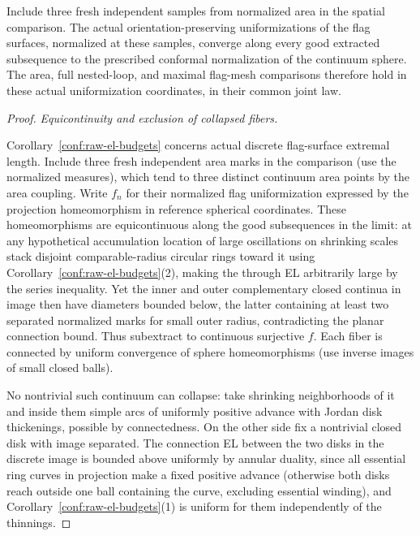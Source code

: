 \begin{proposition}\label{conf:flag-uniformization}
Include three fresh independent samples from normalized area in the spatial comparison. The actual
orientation-preserving uniformizations of the flag surfaces, normalized at these samples, converge
along every good extracted subsequence to the prescribed conformal normalization of the continuum
sphere. The area, full nested-loop, and maximal flag-mesh comparisons therefore hold in these actual
uniformization coordinates, in their common joint law.
\end{proposition}
\begin{proof}
\smallskip\noindent\emph{Equicontinuity and exclusion of collapsed fibers.}\par

Corollary~\ref{conf:raw-el-budgets} concerns actual discrete flag-surface extremal length. Include
three fresh independent area marks in the comparison (use the normalized measures), which tend to
three distinct continuum area points by the area coupling. Write \(f_n\) for their normalized flag
uniformization expressed by the projection homeomorphism in reference spherical coordinates. These
homeomorphisms are equicontinuous along the good subsequences in the limit: at any hypothetical
accumulation location of large oscillations on shrinking scales stack disjoint comparable-radius
circular rings toward it using Corollary~\ref{conf:raw-el-budgets}(2), making the through EL
arbitrarily large by the series inequality. Yet the inner and outer complementary closed continua in
image then have diameters bounded below, the latter containing at least two separated normalized
marks for small outer radius, contradicting the planar connection bound. Thus subextract to
continuous surjective \(f\). Each fiber is connected by uniform convergence of sphere homeomorphisms
(use inverse images of small closed balls).

No nontrivial such continuum can collapse: take shrinking neighborhoods of it and inside them simple
arcs of uniformly positive advance with Jordan disk thickenings, possible by connectedness. On the
other side fix a nontrivial closed disk with image separated. The connection EL between the two
disks in the discrete image is bounded above uniformly by annular duality, since all essential ring
curves in projection make a fixed positive advance (otherwise both disks reach outside one ball
containing the curve, excluding essential winding), and Corollary~\ref{conf:raw-el-budgets}(1) is
uniform for them independently of the thinnings.


\end{proof}
